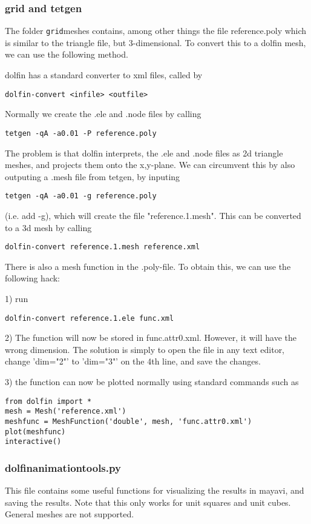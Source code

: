 \subsubsection{grid and tetgen}
The folder \verb /grid/meshes  contains, among other things the file reference.poly which is similar to the triangle file, but 3-dimensional. To convert this to a dolfin mesh, we can use the following method.

dolfin has a standard converter to xml files, called by
\begin{verbatim}
dolfin-convert <infile> <outfile>
\end{verbatim}
Normally we create the .ele and .node files by calling
\begin{verbatim}
tetgen -qA -a0.01 -P reference.poly 
\end{verbatim}
The problem is that dolfin interprets, the .ele and .node files as 2d triangle meshes, and projects them onto the x,y-plane. We can circumvent this by also outputing a .mesh file from tetgen, by inputing
\begin{verbatim}
tetgen -qA -a0.01 -g reference.poly 
\end{verbatim}
(i.e. add -g), which will create the file "reference.1.mesh". This can be converted to a 3d mesh by calling 
\begin{verbatim}
dolfin-convert reference.1.mesh reference.xml
\end{verbatim}
There is also a mesh function in the .poly-file. To obtain this, we can use the following hack: 

1) run
\begin{verbatim}
dolfin-convert reference.1.ele func.xml
\end{verbatim}
2) The function will now be stored in func.attr0.xml. However, it will have the wrong dimension. The solution is simply to open the file in any text editor, change 'dim="2"' to 'dim="3"' on the 4th line, and save the changes. 

3) the function can now be plotted normally using standard commands such as 
\begin{lstlisting}
from dolfin import *
mesh = Mesh('reference.xml')
meshfunc = MeshFunction('double', mesh, 'func.attr0.xml')
plot(meshfunc)
interactive()
\end{lstlisting}


\subsubsection{dolfin\textunderscore animation\textunderscore tools.py}
This file contains some useful functions for visualizing the results in mayavi, and saving the results. Note that this only works for unit squares and unit cubes. General meshes are not supported. 

